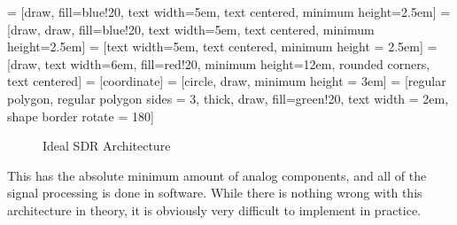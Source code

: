 \documentclass[a4paper, 12pt]{article}
\begin{document}
 = [draw, fill=blue!20, text width=5em, 
    text centered, minimum height=2.5em]
 = [draw, draw, fill=blue!20, text width=5em, 
    text centered, minimum height=2.5em]
 = [text width=5em, text centered, minimum height = 2.5em]
 = [draw, text width=6em, fill=red!20, 
    minimum height=12em, rounded corners, text centered]
 = [coordinate]
 = [circle, draw, minimum height = 3em]
 = [regular polygon, regular polygon sides = 3, thick, draw, fill=green!20, text width = 2em, shape border rotate = 180]


\def\blockdist{2.3}
\def\edgedist{2.5}

\begin{figure}[ht]
\caption{Ideal SDR Architecture}
\label{fig:ideal_sdr}
\centering
{}
\end{figure}

This has the absolute minimum amount of analog components, and all of the signal processing is done in software.  While there is nothing wrong with this architecture in theory, it is obviously very difficult to implement in practice.  
\end{document}
